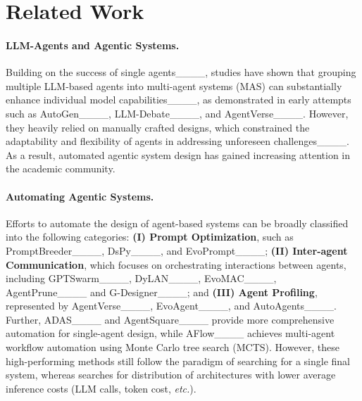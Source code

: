 \section{Related Work}
\vspace{-0.3em}
\paragraph{LLM-Agents and Agentic Systems.}
Building on the success of single agents____, studies have shown that grouping multiple LLM-based agents into multi-agent systems (MAS) can substantially enhance individual model capabilities____, as demonstrated in early attempts such as AutoGen____, LLM-Debate____, and AgentVerse____. 
However, they heavily relied on manually crafted designs, which constrained the adaptability and flexibility of agents in addressing unforeseen challenges____. As a result, automated agentic system design has gained increasing attention in the academic community.




\vspace{-0.6em}
\paragraph{Automating Agentic Systems.}
Efforts to automate the design of agent-based systems can be broadly classified into the following categories: \textbf{(I) Prompt Optimization}, such as PromptBreeder____, DsPy____, and EvoPrompt____; \textbf{(II) Inter-agent Communication}, which focuses on orchestrating interactions between agents, including GPTSwarm____, DyLAN____, EvoMAC____, AgentPrune____ and G-Designer____; and \textbf{(III) Agent Profiling}, represented by AgentVerse____, EvoAgent____, and AutoAgents____. 
Further, ADAS____ and AgentSquare____ provide more comprehensive automation for single-agent design, while AFlow____ achieves multi-agent workflow automation using Monte Carlo tree search (MCTS). However, these high-performing methods still follow the paradigm of searching for a single final system, whereas \ourmethod searches for distribution of architectures with lower average inference costs (LLM calls, token cost, \textit{etc.}).


